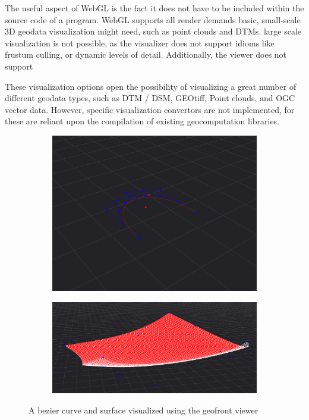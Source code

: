 The useful aspect of WebGL is the fact it does not have to be included within the source code of a program. 
WebGL supports all render demands basic, small-scale 3D geodata visualization might need, such as point clouds and DTMs.
large scale visualization is not possible, as the visualizer does not support idioms like frustum culling, or dynamic levels of detail. 
Additionally, the viewer does not support

These visualization options open the possibility of visualizing a great number of different geodata types, such as DTM / DSM, GEOtiff, Point clouds, and OGC vector data. 
However, specific visualization convertors are not implemented, for these are reliant upon the compilation of existing geocomputation libraries. 

\begin{figure}
  \centering
  \begin{subfigure}[b]{0.45\linewidth}
    \graphicspath{ {../../assets/images/implementation/} }
    \centering
    \includegraphics[width=\linewidth]{viewer-2.png}
    \caption{}\label{fig:viewer-geometries:1}
  \end{subfigure}%
  \qquad 
  \begin{subfigure}[b]{0.45\linewidth}
    \graphicspath{ {../../assets/images/implementation/} }
    \centering
    \includegraphics[width=\linewidth]{viewer-3.png}
    \caption{}\label{fig:viewer-geometries:2}
  \end{subfigure}%
  \caption[Geofront viewer geometries]{A bezier curve and surface visualized using the geofront viewer}
  \label{fig:viewer-geometries}
\end{figure}


